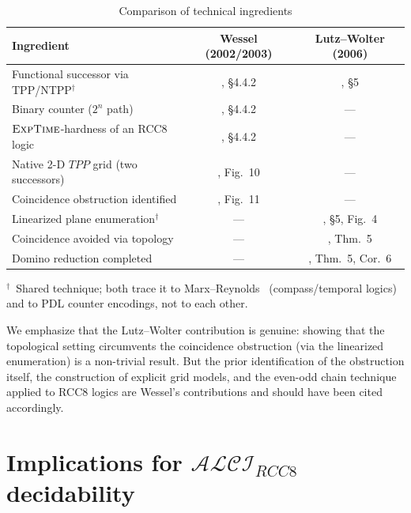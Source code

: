 \documentclass[11pt]{article}
\newcommand{\ALCIRCC}[1]{\ensuremath{\mathcal{ALCI}_{\mathit{RCC#1}}}}
\newcommand{\EXPTIME}{\textsc{ExpTime}}
\begin{document}
\begin{table}[t]
  \centering
  \caption{Comparison of technical ingredients}
  \label{tab:comparison}
  \smallskip
  \begin{tabular}{@{}lcc@{}}
    \toprule
    \textbf{Ingredient} & \textbf{Wessel (2002/2003)} & \textbf{Lutz--Wolter (2006)} \\
    \midrule
    Functional successor via TPP/NTPP$^\dagger$ & \cite{Wessel2003}, \S4.4.2 & \cite{LutzWolter2006}, \S5 \\
    Binary counter ($2^n$ path) & \cite{Wessel2003}, \S4.4.2 & --- \\
    $\EXPTIME$-hardness of an RCC8 logic & \cite{Wessel2003}, \S4.4.2 & --- \\
    Native 2-D $TPP$ grid (two successors) & \cite{Wessel2003}, Fig.~10 & --- \\
    Coincidence obstruction identified & \cite{Wessel2003}, Fig.~11 & --- \\
    Linearized plane enumeration$^\dagger$ & --- & \cite{LutzWolter2006}, \S5, Fig.~4 \\
    Coincidence avoided via topology & --- & \cite{LutzWolter2006}, Thm.~5 \\
    Domino reduction completed & --- & \cite{LutzWolter2006}, Thm.~5, Cor.~6 \\
    \bottomrule
  \end{tabular}

  \smallskip
  {\footnotesize $^\dagger$~Shared technique; both trace it to
  Marx--Reynolds~\cite{MarxReynolds1999} (compass/temporal logics) and to PDL
  counter encodings, not to each other.}
\end{table}

We emphasize that the Lutz--Wolter contribution is genuine: showing that the
topological setting circumvents the coincidence obstruction (via the linearized
enumeration) is a non-trivial result.  But the prior identification of the
obstruction itself, the
construction of explicit grid models, and the even-odd chain technique applied
to RCC8 logics are Wessel's contributions and should have been cited
accordingly.

\section{Implications for $\ALCIRCC{8}$ decidability}
\label{sec:implications}
\end{document}
